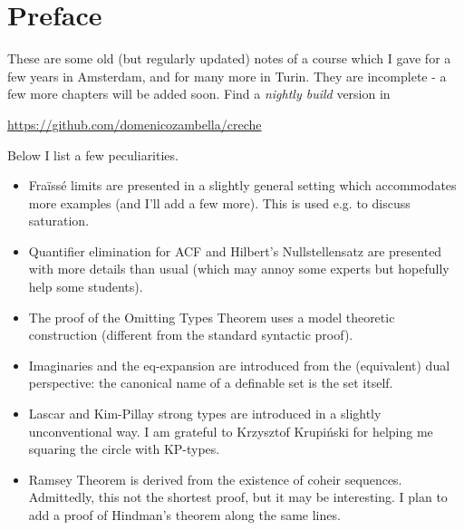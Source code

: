 \documentclass[creche.tex]{subfiles}
\begin{document}
\chapter*{Preface}
\label{praface}

These are some old (but regularly updated) notes of a course which I gave for a few years in Amsterdam, and for many more in Turin. They are incomplete - a few more chapters will be added soon. Find a \textit{nightly build\/} version in 

\url{https://github.com/domenicozambella/creche}


Below I list a few peculiarities.

\begin{itemize}
\item Fraïssé limits are presented in a slightly general setting which accommodates more examples (and I'll add a few more). This is used e.g. to discuss saturation.
\item Quantifier elimination for ACF and Hilbert's Nullstellensatz are presented with more details than usual (which may annoy some experts but hopefully help some students).
\item The proof of the Omitting Types Theorem uses a model theoretic construction (different from the standard syntactic proof).
\item Imaginaries and the eq-expansion are introduced from the (equivalent) dual perspective: the canonical name of a definable set is the set itself.
\item Lascar and Kim-Pillay strong types are introduced in a slightly unconventional way. I am grateful to Krzysztof Krupiński for helping me squaring the circle with KP-types.
\item Ramsey Theorem is derived from the existence of coheir sequences. Admittedly, this not the shortest proof, but it may be interesting. I plan to add a proof of Hindman's theorem along the same lines.
\end{itemize}
\end{document}
